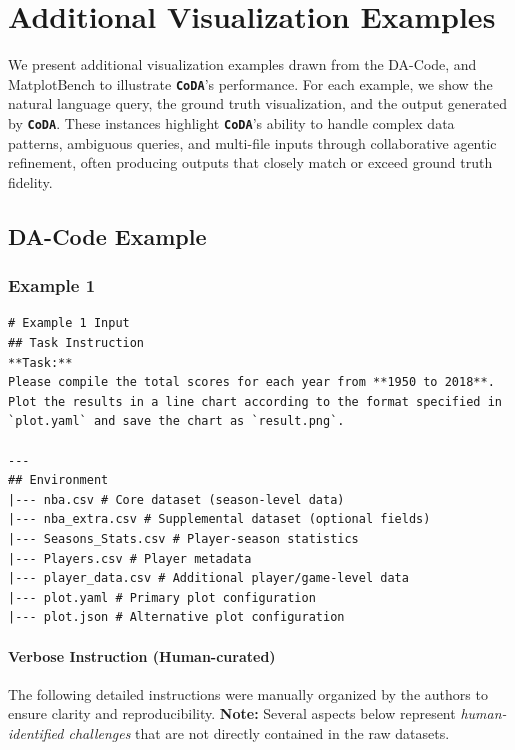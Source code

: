\documentclass[11pt, a4paper, logo, copyright]{googlecloud}
\newcommand{\methodname}{\textbf{\texttt{\textcolor{StarIndigo}{C}\textcolor{StarIndigo}{o}\textcolor{StarCoral}{D}\textcolor{StarTeal}{A}}}}
\begin{document}
\section{Additional Visualization Examples}\label{appendix:add}

We present additional visualization examples drawn from the DA-Code, and MatplotBench to illustrate \methodname{}'s performance. For each example, we show the natural language query, the ground truth visualization, and the output generated by \methodname{}. These instances highlight \methodname{}'s ability to handle complex data patterns, ambiguous queries, and multi-file inputs through collaborative agentic refinement, often producing outputs that closely match or exceed ground truth fidelity.

\subsection{DA-Code Example}
\subsubsection{Example 1}
\begin{verbatim}
# Example 1 Input
## Task Instruction
**Task:**  
Please compile the total scores for each year from **1950 to 2018**.  
Plot the results in a line chart according to the format specified in `plot.yaml` and save the chart as `result.png`.

---
## Environment
|--- nba.csv # Core dataset (season-level data)
|--- nba_extra.csv # Supplemental dataset (optional fields)
|--- Seasons_Stats.csv # Player-season statistics
|--- Players.csv # Player metadata
|--- player_data.csv # Additional player/game-level data
|--- plot.yaml # Primary plot configuration
|--- plot.json # Alternative plot configuration
\end{verbatim}

\paragraph{Verbose Instruction (Human-curated)}

The following detailed instructions were manually organized by the authors to ensure clarity and reproducibility. 
\textbf{Note:} Several aspects below represent \emph{human-identified challenges} that are not directly contained in the raw datasets.
\end{document}
